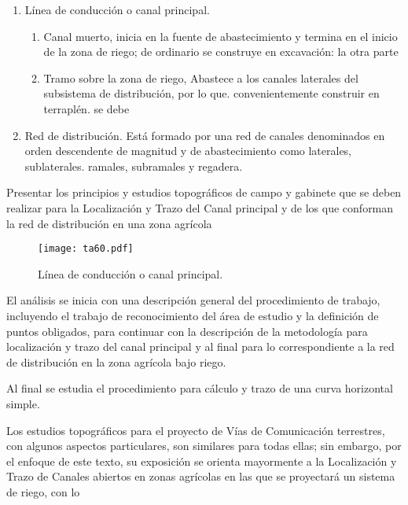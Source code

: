 \begin{enumerate}
    \item Línea de conducción o canal principal.
    \begin{enumerate}
        \item Canal muerto, inicia en la fuente de abastecimiento y termina en el inicio de la zona de riego; de ordinario se construye en excavación: la otra parte
        \item Tramo sobre la zona de riego, Abastece a los canales laterales del subsistema de distribución, por lo que. convenientemente construir en terraplén. se debe
    \end{enumerate}
    \item Red de distribución. Está formado por una red de canales denominados en orden descendente de magnitud y de abastecimiento como laterales, sublaterales. ramales, subramales y regadera.
\end{enumerate}
Presentar los principios y estudios topográficos de campo y gabinete que se deben realizar para la Localización y Trazo del Canal principal y de los que conforman la red de distribución en una zona agrícola
\begin{figure}[h!]
\centering
  \texttt{[image: ta60.pdf]}
  \caption{Línea de conducción o canal principal.}
  \label{ta60}
\end{figure}
El análisis se inicia con una descripción general del procedimiento de trabajo, incluyendo el trabajo de reconocimiento del área de estudio y la definición de puntos obligados, para continuar con la descripción de la metodología para localización y trazo del canal principal y al final para lo correspondiente a la red de distribución en la zona agrícola bajo riego.

Al final se estudia el procedimiento para cálculo y trazo de una curva horizontal simple.

Los estudios topográficos para el proyecto de Vías de Comunicación terrestres, con algunos aspectos particulares, son similares para todas ellas; sin embargo, por el enfoque de este texto, su exposición se orienta mayormente a la Localización y Trazo de Canales abiertos en zonas agrícolas en las que se proyectará un sistema de riego, con lo 

